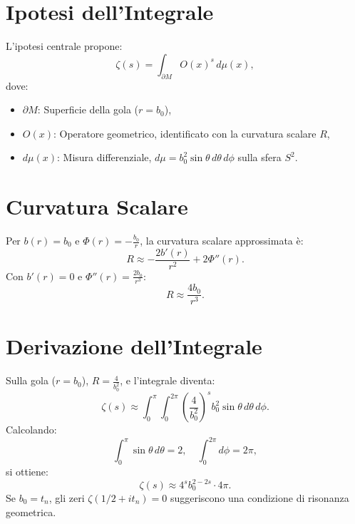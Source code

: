 \documentclass[11pt]{article}
\begin{document}
\section{Ipotesi dell’Integrale}
L’ipotesi centrale propone:
\begin{equation}
\zeta(s) = \int_{\partial M} O(x)^s \, d\mu(x),
\label{eq:integral}
\end{equation}
dove:
\begin{itemize}
    \item \( \partial M \): Superficie della gola (\( r = b_0 \)),
    \item \( O(x) \): Operatore geometrico, identificato con la curvatura scalare \( R \),
    \item \( d\mu(x) \): Misura differenziale, \( d\mu = b_0^2 \sin\theta \, d\theta \, d\phi \) sulla sfera \( S^2 \).
\end{itemize}

\section{Curvatura Scalare}
Per \( b(r) = b_0 \) e \( \Phi(r) = -\frac{b_0}{r} \), la curvatura scalare approssimata è:
\begin{equation}
R \approx -\frac{2 b'(r)}{r^2} + 2 \Phi''(r).
\end{equation}
Con \( b'(r) = 0 \) e \( \Phi''(r) = \frac{2 b_0}{r^3} \):
\begin{equation}
R \approx \frac{4 b_0}{r^3}.
\label{eq:curvature}
\end{equation}

\section{Derivazione dell’Integrale}
Sulla gola (\( r = b_0 \)), \( R = \frac{4}{b_0^2} \), e l’integrale diventa:
\begin{equation}
\zeta(s) \approx \int_0^\pi \int_0^{2\pi} \left( \frac{4}{b_0^2} \right)^s b_0^2 \sin\theta \, d\theta \, d\phi.
\end{equation}
Calcolando:
\begin{equation}
\int_0^\pi \sin\theta \, d\theta = 2, \quad \int_0^{2\pi} d\phi = 2\pi,
\end{equation}
si ottiene:
\begin{equation}
\zeta(s) \approx 4^s b_0^{2-2s} \cdot 4\pi.
\label{eq:integral_result}
\end{equation}
Se \( b_0 = t_n \), gli zeri \( \zeta(1/2 + it_n) = 0 \) suggeriscono una condizione di risonanza geometrica.
\end{document}
